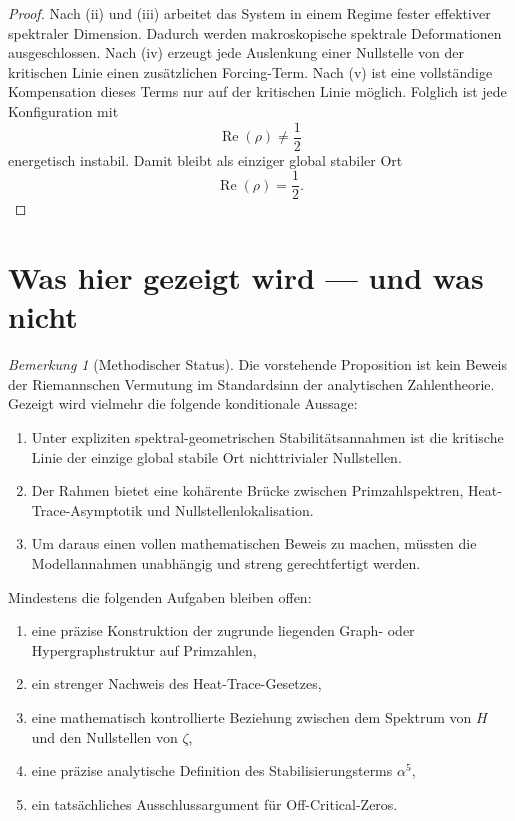 \documentclass[11pt,a4paper]{amsart}
\theoremstyle{plain}
\theoremstyle{definition}
\theoremstyle{remark}
\newtheorem{bemerkung}[satz]{Bemerkung}
\newcommand{\RePart}{\operatorname{Re}}
\newcommand{\zetaR}{\zeta}
\begin{document}
	\begin{proof}
		Nach (ii) und (iii) arbeitet das System in einem Regime fester effektiver spektraler Dimension. Dadurch werden makroskopische spektrale Deformationen ausgeschlossen. Nach (iv) erzeugt jede Auslenkung einer Nullstelle von der kritischen Linie einen zusätzlichen Forcing-Term. Nach (v) ist eine vollständige Kompensation dieses Terms nur auf der kritischen Linie möglich. Folglich ist jede Konfiguration mit
		\[
		\RePart(\rho)\neq\frac12
		\]
		energetisch instabil. Damit bleibt als einziger global stabiler Ort
		\[
		\RePart(\rho)=\frac12.
		\]
	\end{proof}
	
	\section{Was hier gezeigt wird --- und was nicht}
	
	\begin{bemerkung}[Methodischer Status]
		Die vorstehende Proposition ist kein Beweis der Riemannschen Vermutung im Standardsinn der analytischen Zahlentheorie. Gezeigt wird vielmehr die folgende konditionale Aussage:
		\begin{enumerate}[label=\arabic*.]
			\item Unter expliziten spektral-geometrischen Stabilitätsannahmen ist die kritische Linie der einzige global stabile Ort nichttrivialer Nullstellen.
			\item Der Rahmen bietet eine kohärente Brücke zwischen Primzahlspektren, Heat-Trace-Asymptotik und Nullstellenlokalisation.
			\item Um daraus einen vollen mathematischen Beweis zu machen, müssten die Modellannahmen unabhängig und streng gerechtfertigt werden.
		\end{enumerate}
	\end{bemerkung}
	
	Mindestens die folgenden Aufgaben bleiben offen:
	\begin{enumerate}[label=\alph*)]
		\item eine präzise Konstruktion der zugrunde liegenden Graph- oder Hypergraphstruktur auf Primzahlen,
		\item ein strenger Nachweis des Heat-Trace-Gesetzes,
		\item eine mathematisch kontrollierte Beziehung zwischen dem Spektrum von \(H\) und den Nullstellen von \(\zetaR\),
		\item eine präzise analytische Definition des Stabilisierungsterms \(\alpha^5\),
		\item ein tatsächliches Ausschlussargument für Off-Critical-Zeros.
	\end{enumerate}
	
\end{document}
